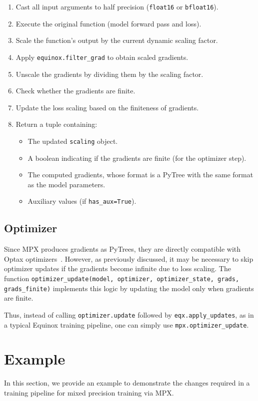 \documentclass[copyright, logo]{dsme}
\newcommand{\mpx}{\textsc{MPX}}
\begin{document}
\begin{enumerate}
    \item Cast all input arguments to half precision (\texttt{float16} or \texttt{bfloat16}).
    \item Execute the original function (model forward pass and loss).
    \item Scale the function's output by the current dynamic scaling factor.
    \item Apply \texttt{equinox.filter\_grad} to obtain scaled gradients.
    \item Unscale the gradients by dividing them by the scaling factor.
    \item Check whether the gradients are finite.
    \item Update the loss scaling based on the finiteness of gradients.
    \item Return a tuple containing:
    \begin{itemize}
        \item The updated \texttt{scaling} object.
        \item A boolean indicating if the gradients are finite (for the optimizer step).
        \item The computed gradients, whose format is a PyTree with the same format as the model parameters.
        \item Auxiliary values (if \texttt{has\_aux=True}).
    \end{itemize}
\end{enumerate}



\subsection{Optimizer}
\label{sec:optimizer}

Since \mpx{} produces gradients as PyTrees, they are directly compatible with Optax optimizers~\citep{deepmind2020jax}.
However, as previously discussed, it may be necessary to skip optimizer updates if the gradients become infinite due to loss scaling. 
The function \texttt{optimizer\_update(model, optimizer, optimizer\_state, grads, grads\_finite)} implements this logic by updating the model only when gradients are finite.

Thus, instead of calling \texttt{optimizer.update} followed by \texttt{eqx.apply\_updates}, as in a typical Equinox training pipeline, one can simply use \texttt{mpx.optimizer\_update}.


\section{Example}
In this section, we provide an example to demonstrate the changes required in a training pipeline for mixed precision training via \mpx{}.
\end{document}
